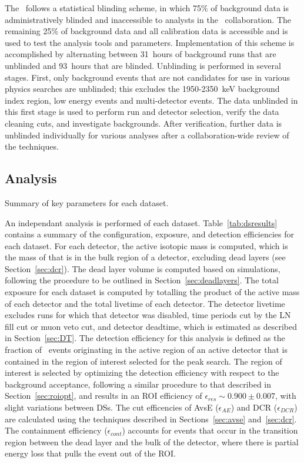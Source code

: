 \documentclass[/main.tex]{subfiles}
\begin{document}
The \MJD\ follows a statistical blinding scheme, in which 75\% of background data is administratively blinded and inaccessible to analysts in the \MJ\ collaboration.
The remaining 25\% of background data and all calibration data is accessible and is used to test the analysis tools and parameters.
Implementation of this scheme is accomplished by alternating between 31~hours of background runs that are unblinded and 93~hours that are blinded.
Unblinding is performed in several stages.
First, only background events that are not candidates for use in various physics searches are unblinded; this excludes the 1950-2350~keV background index region, low energy events and multi-detector events.
The data unblinded in this first stage is used to perform run and detector selection, verify the data cleaning cuts, and investigate backgrounds.
After verification, further data is unblinded individually for various analyses after a collaboration-wide review of the techniques.

\subsection{Analysis}
\begin{table}[h]
  \centering
  \caption[Summary of datasets]{\label{tab:dsresults}
    Summary of key parameters for each dataset.
  }
  \footnotesize
  
\end{table}
An independant analysis is performed of each dataset.
Table~\ref{tab:dsresults} contains a summary of the configuration, exposure, and detection efficiencies for each dataset.
For each detector, the active isotopic mass is computed, which is the mass of  that is in the bulk region of a detector, excluding dead layers (see Section~\ref{sec:dcr}).
The dead layer volume is computed based on simulations, following the procedure to be outlined in Section~\ref{sec:deadlayers}.
The total exposure for each dataset is computed by totalling the product of the active mass of each detector and the total livetime of each detector.
The detector livetime excludes runs for which that detector was disabled, time periods cut by the LN fill cut or muon veto cut, and detector deadtime, which is estimated as described in Section~\ref{sec:DT}.
The detection efficiency for this analysis is defined as the fraction of \znbb\ events originating in the active region of an active detector that is contained in the region of interest selected for the peak search.
The region of interest is selected by optimizing the detection efficiency with respect to the background acceptance, following a similar procedure to that described in Section~\ref{sec:roiopt}, and results in an ROI efficiency of $\epsilon_{res}\sim0.900\pm0.007$, with slight variations between DSs.
The cut efficencies of AvsE ($\epsilon_{AE}$) and DCR ($\epsilon_{DCR}$) are calculated using the techniques described in Sections~\ref{sec:avse} and~\ref{sec:dcr}.
The containment efficiency ($\epsilon_{cont}$) accounts for events that occur in the transition region between the dead layer and the bulk of the detector, where there is partial energy loss that pulls the event out of the ROI.
\end{document}
